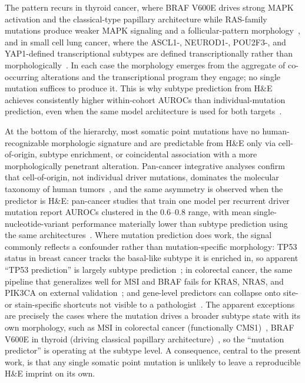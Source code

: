 The pattern recurs in thyroid cancer, where BRAF V600E drives strong MAPK activation and the classical-type papillary architecture while RAS-family mutations produce weaker MAPK signaling and a follicular-pattern morphology~\cite{agrawalIntegratedGenomicCharacterization2014}, and in small cell lung cancer, where the ASCL1-, NEUROD1-, POU2F3-, and YAP1-defined transcriptional subtypes are defined transcriptionally rather than morphologically~\cite{rudinMolecularSubtypesSmall2019}.
In each case the morphology emerges from the aggregate of co-occurring alterations and the transcriptional program they engage; no single mutation suffices to produce it.
This is why subtype prediction from H\&E achieves consistently higher within-cohort AUROCs than individual-mutation prediction, even when the same model architecture is used for both targets~\cite{katherPancancerImagebasedDetection2020, arslanSystematicPancancerStudy2024}.

At the bottom of the hierarchy, most somatic point mutations have no human-recognizable morphologic signature and are predictable from H\&E only via cell-of-origin, subtype enrichment, or coincidental association with a more morphologically penetrant alteration.
Pan-cancer integrative analyses confirm that cell-of-origin, not individual driver mutations, dominates the molecular taxonomy of human tumors~\cite{hoadleyCellofOriginPatternsDominate2018}, and the same asymmetry is observed when the predictor is H\&E: pan-cancer studies that train one model per recurrent driver mutation report AUROCs clustered in the 0.6--0.8 range, with mean single-nucleotide-variant performance materially lower than subtype prediction using the same architectures~\cite{coudrayClassificationMutationPrediction2018, fuPancancerComputationalHistopathology2020, katherPancancerImagebasedDetection2020, arslanSystematicPancancerStudy2024}.
Where mutation prediction does work, the signal commonly reflects a confounder rather than mutation-specific morphology: TP53 status in breast cancer tracks the basal-like subtype it is enriched in, so apparent ``TP53 prediction'' is largely subtype prediction~\cite{koboldtComprehensiveMolecularPortraits2012}; in colorectal cancer, the same pipeline that generalizes well for MSI and BRAF fails for KRAS, NRAS, and PIK3CA on external validation~\cite{niehuesGeneralizableBiomarkerPrediction2023}; and gene-level predictors can collapse onto site- or stain-specific shortcuts not visible to a pathologist~\cite{niehuesGeneralizableBiomarkerPrediction2023, howardImpactSitespecificDigital2021}.
The apparent exceptions are precisely the cases where the mutation drives a broader subtype state with its own morphology, such as MSI in colorectal cancer (functionally CMS1)~\cite{echleClinicalGradeDetectionMicrosatellite2020,guinneyConsensusMolecularSubtypes2015}, BRAF V600E in thyroid (driving classical papillary architecture)~\cite{agrawalIntegratedGenomicCharacterization2014}, so the ``mutation predictor'' is operating at the subtype level.
A consequence, central to the present work, is that any single somatic point mutation is unlikely to leave a reproducible H\&E imprint on its own.

